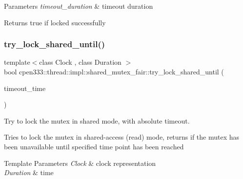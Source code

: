 \begin{DoxyParams}{Parameters}
{\em timeout\+\_\+duration} & timeout duration \\
\hline
\end{DoxyParams}
\begin{DoxyReturn}{Returns}
true if locked successfully 
\end{DoxyReturn}
\mbox{\label{classcpen333_1_1thread_1_1impl_1_1shared__mutex__fair_a13082f2a4d6c63b3a9c6b288a0259252}} 
\subsubsection{\texorpdfstring{try\+\_\+lock\+\_\+shared\+\_\+until()}{try\_lock\_shared\_until()}}
{\footnotesize\ttfamily template$<$class Clock , class Duration $>$ \\
bool cpen333\+::thread\+::impl\+::shared\+\_\+mutex\+\_\+fair\+::try\+\_\+lock\+\_\+shared\+\_\+until (\begin{DoxyParamCaption}\item[{const std\+::chrono\+::time\+\_\+point$<$ Clock, Duration $>$ \&}]{timeout\+\_\+time }\end{DoxyParamCaption})\hspace{0.3cm}{\ttfamily [inline]}}



Try to lock the mutex in shared mode, with absolute timeout. 

Tries to lock the mutex in shared-\/access (read) mode, returns if the mutex has been unavailable until specified time point has been reached


\begin{DoxyTemplParams}{Template Parameters}
{\em Clock} & clock representation \\
\hline
{\em Duration} & time \\
\hline
\end{DoxyTemplParams}

